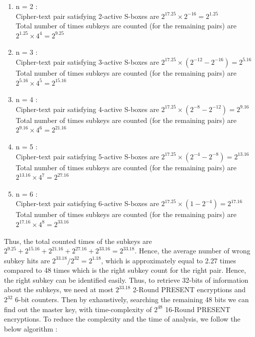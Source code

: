 \documentclass[preprint]{transcrypto}
\begin{document}
\begin{enumerate}
    \item n = 2 : \\ 
    Cipher-text pair satisfying 2-active S-boxes are $2^{17.25} \times 2^{-16} = 2^{1.25}$ \\ 
    Total number of times subkeys are counted (for the remaining pairs) are $2^{1.25} \times 4^{4} = 2^{9.25}$ 
    \item n = 3 : \\ 
    Cipher-text pair satisfying 3-active S-boxes are $2^{17.25} \times (2^{-12}-2^{-16}) = 2^{5.16}$ \\ 
    Total number of times subkeys are counted (for the remaining pairs) are $2^{5.16} \times 4^{5} = 2^{15.16}$
    \item n = 4 : \\ 
    Cipher-text pair satisfying 4-active S-boxes are $2^{17.25} \times (2^{-8}-2^{-12}) = 2^{9.16}$ \\ 
    Total number of times subkeys are counted (for the remaining pairs) are $2^{9.16} \times 4^{6} = 2^{21.16}$
    \item n = 5 : \\ 
    Cipher-text pair satisfying 5-active S-boxes are $2^{17.25} \times (2^{-4}-2^{-8}) = 2^{13.16}$ \\ 
    Total number of times subkeys are counted (for the remaining pairs) are $2^{13.16} \times 4^{7} = 2^{27.16}$
    \item n = 6 : \\ 
    Cipher-text pair satisfying 6-active S-boxes are $2^{17.25} \times (1-2^{-4}) = 2^{17.16}$ \\ 
    Total number of times subkeys are counted (for the remaining pairs) are $2^{17.16} \times 4^{8} = 2^{33.16}$
\end{enumerate}
Thus, the total counted times of the subkeys are $2^{9.25}+2^{15.16}+2^{21.16}+2^{27.16}+2^{33.16} = 2^{33.18}$. Hence, the average number of wrong subkey hits are $2^{33.18}/2^{32} = 2^{1.18}$, which is approximately equal to 2.27 times compared to 48 times which is the right subkey count for the right pair. Hence, the right subkey can be identified easily. Thus, to retrieve 32-bits of information about the subkeys, we need at most $2^{33.18}$ 2-Round PRESENT encryptions and $2^{32}$ 6-bit counters. Then by exhaustively, searching the remaining 48 bits we can find out the master key, with time-complexity of $2^{48}$ 16-Round PRESENT encryptions. To reduce the complexity and the time of analysis, we follow the below algorithm : 
\end{document}
